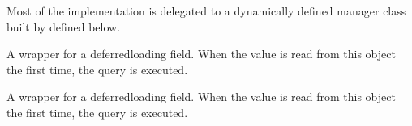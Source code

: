 \documentclass[letterpaper,10pt,spanish]{sphinxmanual}
\begin{document}
\begin{fulllineitems}
\begin{fulllineitems}
\sphinxAtStartPar
Most of the implementation is delegated to a dynamically defined manager
class built by  defined below.

\end{fulllineitems}



\begin{fulllineitems}

\pysigstartsignatures
{}
\pysigstopsignatures
\sphinxAtStartPar
A wrapper for a deferred\sphinxhyphen{}loading field. When the value is read from this
object the first time, the query is executed.

\end{fulllineitems}



\begin{fulllineitems}

\pysigstartsignatures
{}
\pysigstopsignatures
\end{fulllineitems}



\begin{fulllineitems}

\pysigstartsignatures
{}
\pysigstopsignatures
\sphinxAtStartPar
A wrapper for a deferred\sphinxhyphen{}loading field. When the value is read from this
object the first time, the query is executed.

\end{fulllineitems}


\end{fulllineitems}
\end{document}
